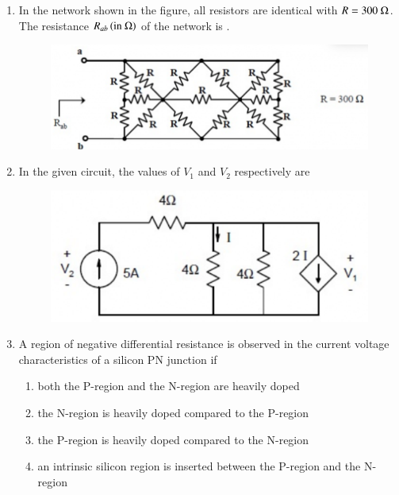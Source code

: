 \documentclass[a4paper, 11pt]{article}
\begin{document}
\begin{enumerate}
    \hfill{}

    \item In the network shown in the figure, all resistors are identical with $R=300~\ohm$. The resistance $R_{ab} \left(\text{in } \ohm\right)$ of the network is \underline{\hspace{2cm}}.
    \begin{figure}[H]
        \centering
        \includegraphics[width=0.6\columnwidth]{figs/q17.png}
        \caption*{}
        \label{fig:q17}
    \end{figure}
    
    \hfill{}

    \item In the given circuit, the values of $V_{1}$ and $V_{2}$ respectively are
    \begin{figure}[H]
        \centering
        \includegraphics[width=0.5\columnwidth]{figs/q18.png}
        \caption*{}
        \label{fig:q18}
    \end{figure}
    \begin{enumerate}
    \end{enumerate}
    
    \hfill{}

    \item A region of negative differential resistance is observed in the current voltage characteristics of a silicon PN junction if
    \begin{enumerate}
        \item both the P-region and the N-region are heavily doped
        \item the N-region is heavily doped compared to the P-region
        \item the P-region is heavily doped compared to the N-region
        \item an intrinsic silicon region is inserted between the P-region and the N-region
    \end{enumerate}
    

\end{enumerate}
\end{document}
